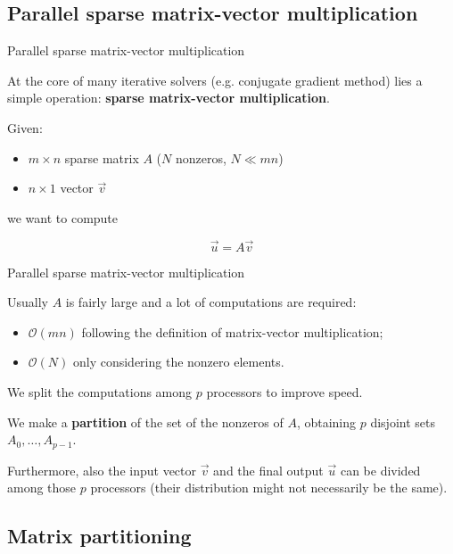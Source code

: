 \subsection{Parallel sparse matrix-vector multiplication}
\begin{frame}{Parallel sparse matrix-vector multiplication}

At the core of many iterative solvers (e.g. conjugate gradient method) lies a simple operation: \textbf{sparse matrix-vector multiplication}.

\vspace{0.5cm}

Given:
\begin{itemize}
	\item $m \times n$ sparse matrix $A$ ($N$ nonzeros, $N \ll mn$)
	\item $n \times 1$ vector $\vec{v}$
\end{itemize}

we want to compute

	$$\vec{u}=A\vec{v}$$

\end{frame}

\begin{frame}{Parallel sparse matrix-vector multiplication}

	Usually $A$ is fairly large and a lot of computations are required:
	\begin{itemize}
		\item $\mathcal{O}(mn)$ following the definition of matrix-vector multiplication;
		\item $\mathcal{O}(N)$ only considering the nonzero elements. 
	\end{itemize}
	
	We split the computations among $p$ processors to improve speed.

	We make a \textbf{partition} of the set of the nonzeros of $A$, obtaining $p$ disjoint sets $A_0,\dots,A_{p-1}$.

	Furthermore, also the input vector $\vec{v}$ and the final output $\vec{u}$ can be divided among those $p$ processors (their distribution might not necessarily be the same).

\end{frame}

\subsection{Matrix partitioning}

